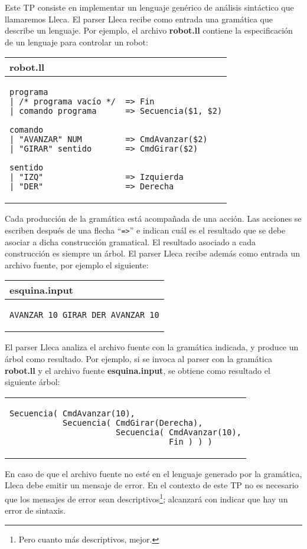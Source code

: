 \documentclass{article}
\newcommand{\lleca}{\textsf{Lleca}\xspace}
\begin{document}
Este TP consiste en implementar un lenguaje gen\'erico de an\'alisis
sint\'actico que llamaremos \lleca.
El parser \lleca recibe como entrada una gram\'atica que describe
un lenguaje. Por ejemplo, el archivo {\bf robot.ll} contiene la
especificaci\'on de un lenguaje para controlar un robot:\\
\begin{center}
\begin{tabular}{|p{}|}
\hline
{\bf robot.ll}
\\
\hline
\begin{verbatim}
programa
| /* programa vacío */  => Fin
| comando programa      => Secuencia($1, $2)

comando
| "AVANZAR" NUM         => CmdAvanzar($2)
| "GIRAR" sentido       => CmdGirar($2)

sentido
| "IZQ"                 => Izquierda
| "DER"                 => Derecha
\end{verbatim}
\\
\hline
\end{tabular}
\end{center}
Cada producci\'on de la gram\'atica est\'a acompa\~nada de una acci\'on.
Las acciones se escriben despu\'es de una flecha ``\texttt{=>}''
e indican cu\'al
es el resultado que se debe asociar a dicha construcci\'on gramatical.
El resultado asociado a cada construcci\'on es siempre un \'arbol.
El parser \lleca recibe
adem\'as como entrada un archivo fuente, por ejemplo el siguiente:
\begin{center}
\begin{tabular}{|p{}|}
\hline
{\bf esquina.input}
\\
\hline
\begin{verbatim}
AVANZAR 10 GIRAR DER AVANZAR 10
\end{verbatim}
\\
\hline
\end{tabular}
\end{center}
El parser \lleca analiza el archivo fuente con la gram\'atica indicada,
y produce un \'arbol como resultado.
Por ejemplo, si se invoca al parser con la gram\'atica
{\bf robot.ll} y el archivo fuente {\bf esquina.input},
se obtiene como resultado el siguiente \'arbol:
\begin{center}
\begin{tabular}{p{}}
\begin{verbatim}
Secuencia( CmdAvanzar(10),
           Secuencia( CmdGirar(Derecha),
                      Secuencia( CmdAvanzar(10),
                                 Fin ) ) )
\end{verbatim}
\end{tabular}
\end{center}
En caso de que el archivo fuente no est\'e en el lenguaje generado
por la gram\'atica, \lleca debe emitir un mensaje de error.
En el contexto de este TP no es necesario que los mensajes de error sean
descriptivos\footnote{Pero cuanto m\'as descriptivos, mejor.}; alcanzar\'a con indicar que hay un error
de sintaxis.
\end{document}
